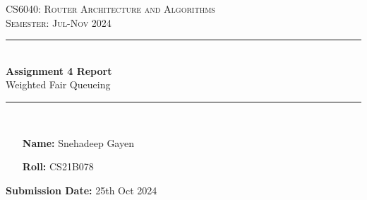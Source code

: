 \thispagestyle{empty} %
\begin{titlepage}
\begin{center}
	\doublespacing %
	\textsc{\huge CS6040: Router Architecture and Algorithms}\\
	\vspace{2.0cm} %
	\onehalfspacing
	\textsc{\Large Semester: Jul-Nov 2024}\\
	\vspace{1.0cm}
	
	\rule{\linewidth}{0.5mm}\\ %
	\vspace{1.4cm}
	\huge \textbf{Assignment 4 Report}\\ %
	\vspace{1cm}
	\large Weighted Fair Queueing \normalsize
	\vspace{0.3cm}
	\rule{\linewidth}{0.5mm}\\
	\vspace{2.4cm}
\end{center}

\onehalfspacing

\begin{minipage}[t]{0.8\textwidth}
	\begin{itemize}
	\item[\textbf{Name:}] Snehadeep Gayen
	\item[\textbf{Roll:}] CS21B078
	\end{itemize}
\end{minipage}

\vspace{2.9cm}

\flushright \textbf{Submission Date:} 25th Oct 2024
\end{titlepage}
\restoregeometry

\onehalfspacing